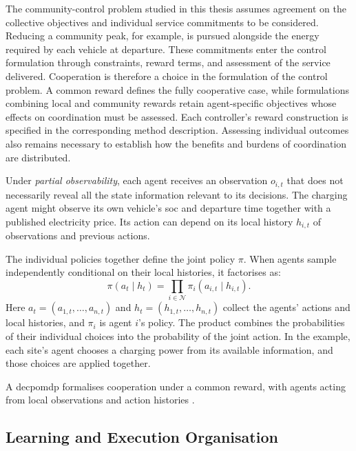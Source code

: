The community-control problem studied in this thesis assumes agreement on the collective objectives and individual service commitments to be considered. Reducing a community peak, for example, is pursued alongside the energy required by each vehicle at departure. These commitments enter the control formulation through constraints, reward terms, and assessment of the service delivered. Cooperation is therefore a choice in the formulation of the control problem. A common reward defines the fully cooperative case, while formulations combining local and community rewards retain agent-specific objectives whose effects on coordination must be assessed. Each controller's reward construction is specified in the corresponding method description. Assessing individual outcomes also remains necessary to establish how the benefits and burdens of coordination are distributed.

Under \emph{partial observability}, each agent receives an observation $o_{i,t}$ that does not necessarily reveal all the state information relevant to its decisions. The charging agent might observe its own vehicle's \gls{soc} and departure time together with a published electricity price. Its action can depend on its local history $h_{i,t}$ of observations and previous actions.

The individual policies together define the joint policy $\pi$. When agents sample independently conditional on their local histories, it factorises as:
\begin{equation}
\pi(a_t\mid h_t)
=\prod_{i\in\mathcal N}\pi_i(a_{i,t}\mid h_{i,t}).
\label{eq:ch2-joint-policy}
\end{equation}
Here $a_t=(a_{1,t},\ldots,a_{n,t})$ and $h_t=(h_{1,t},\ldots,h_{n,t})$ collect the agents' actions and local histories, and $\pi_i$ is agent $i$'s policy. The product combines the probabilities of their individual choices into the probability of the joint action. In the example, each site's agent chooses a charging power from its available information, and those choices are applied together.

A \gls{decpomdp} formalises cooperation under a common reward, with agents acting from local observations and action histories \parencite{oliehoek2016decpomdp}.

\subsection{Learning and Execution Organisation}
\label{sec:ch2-ctde}
\label{sec:ch2-parameter-sharing}

